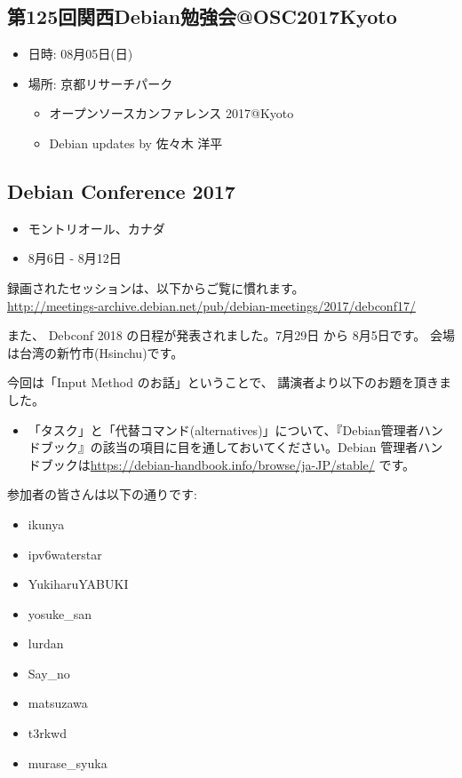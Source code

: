 \documentclass[mingoth,a4paper]{jsarticle}
\begin{document}
\subsection{第125回関西Debian勉強会@OSC2017Kyoto}
\begin{itemize}
\item 日時: 08月05日(日)
\item 場所: 京都リサーチパーク
    \begin{itemize}
        \item{オープンソースカンファレンス 2017@Kyoto}
        \item{Debian updates by 佐々木 洋平}
    \end{itemize}
\end{itemize}

\subsection{Debian Conference 2017}
\begin{itemize}
  \item モントリオール、カナダ
  \item 8月6日 - 8月12日 
\end{itemize}

録画されたセッションは、以下からご覧に慣れます。\\
\url{http://meetings-archive.debian.net/pub/debian-meetings/2017/debconf17/}

また、 Debconf 2018 の日程が発表されました。7月29日 から 8月5日です。
会場は台湾の新竹市(Hsinchu)です。


今回は「Input Method のお話」ということで、
講演者より以下のお題を頂きました。
\begin{itemize}
\item %
  「タスク」と「代替コマンド(alternatives)」について、『Debian管理者ハンドブック』の該当の項目に目を通しておいてください。Debian 管理者ハンドブックは\href{https://debian-handbook.info/browse/ja-JP/stable/}{https://debian-handbook.info/browse/ja-JP/stable/} です。
\end{itemize}

参加者の皆さんは以下の通りです:

\begin{itemize}
\item ikunya
\item ipv6waterstar
\item YukiharuYABUKI
\item yosuke\_san
\item lurdan
\item Say\_no
\item matsuzawa
\item t3rkwd
\item murase\_syuka 
\end{itemize}
\end{document}
